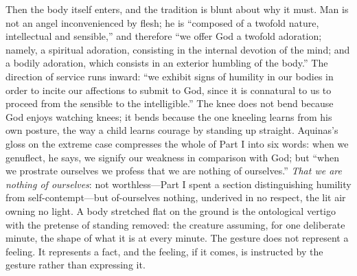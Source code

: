 Then the body itself enters, and the tradition is blunt about why it must. Man is not an angel inconvenienced by flesh; he is ``composed of a twofold nature, intellectual and sensible,'' and therefore ``we offer God a twofold adoration; namely, a spiritual adoration, consisting in the internal devotion of the mind; and a bodily adoration, which consists in an exterior humbling of the body.'' The direction of service runs inward: ``we exhibit signs of humility in our bodies in order to incite our affections to submit to God, since it is connatural to us to proceed from the sensible to the intelligible.'' The knee does not bend because God enjoys watching knees; it bends because the one kneeling learns from his own posture, the way a child learns courage by standing up straight. Aquinas's gloss on the extreme case compresses the whole of Part I into six words: when we genuflect, he says, we signify our weakness in comparison with God; but ``when we prostrate ourselves we profess that we are nothing of ourselves.'' \emph{That we are nothing of ourselves}: not worthless---Part I spent a section distinguishing humility from self-contempt---but of-ourselves nothing, underived in no respect, the lit air owning no light. A body stretched flat on the ground is the ontological vertigo with the pretense of standing removed: the creature assuming, for one deliberate minute, the shape of what it is at every minute. The gesture does not represent a feeling. It represents a fact, and the feeling, if it comes, is instructed by the gesture rather than expressing it.

